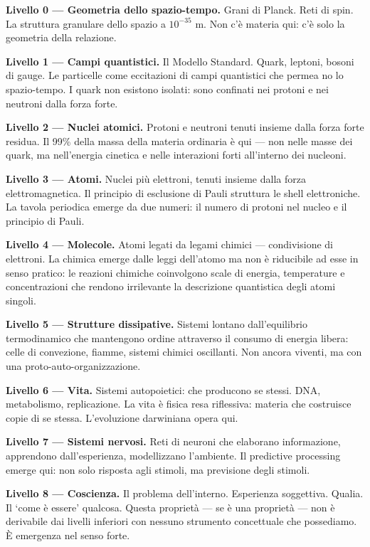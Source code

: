 \documentclass[12pt,a4paper,openany]{book}
\begin{document}
\textbf{Livello 0 — Geometria dello spazio-tempo.} Grani di Planck. Reti di spin. La struttura granulare dello spazio a $10^{-35}$ m. Non c'è materia qui: c'è solo la geometria della relazione.

\textbf{Livello 1 — Campi quantistici.} Il Modello Standard. Quark, leptoni, bosoni di gauge. Le particelle come eccitazioni di campi quantistici che permea no lo spazio-tempo. I quark non esistono isolati: sono confinati nei protoni e nei neutroni dalla forza forte.

\textbf{Livello 2 — Nuclei atomici.} Protoni e neutroni tenuti insieme dalla forza forte residua. Il 99\% della massa della materia ordinaria è qui — non nelle masse dei quark, ma nell'energia cinetica e nelle interazioni forti all'interno dei nucleoni.

\textbf{Livello 3 — Atomi.} Nuclei più elettroni, tenuti insieme dalla forza elettromagnetica. Il principio di esclusione di Pauli struttura le shell elettroniche. La tavola periodica emerge da due numeri: il numero di protoni nel nucleo e il principio di Pauli.

\textbf{Livello 4 — Molecole.} Atomi legati da legami chimici — condivisione di elettroni. La chimica emerge dalle leggi dell'atomo ma non è riducibile ad esse in senso pratico: le reazioni chimiche coinvolgono scale di energia, temperature e concentrazioni che rendono irrilevante la descrizione quantistica degli atomi singoli.

\textbf{Livello 5 — Strutture dissipative.} Sistemi lontano dall'equilibrio termodinamico che mantengono ordine attraverso il consumo di energia libera: celle di convezione, fiamme, sistemi chimici oscillanti. Non ancora viventi, ma con una proto-auto-organizzazione.

\textbf{Livello 6 — Vita.} Sistemi autopoietici: che producono se stessi. DNA, metabolismo, replicazione. La vita è fisica resa riflessiva: materia che costruisce copie di se stessa. L'evoluzione darwiniana opera qui.

\textbf{Livello 7 — Sistemi nervosi.} Reti di neuroni che elaborano informazione, apprendono dall'esperienza, modellizzano l'ambiente. Il predictive processing emerge qui: non solo risposta agli stimoli, ma previsione degli stimoli.

\textbf{Livello 8 — Coscienza.} Il problema dell'interno. Esperienza soggettiva. Qualia. Il `come è essere' qualcosa. Questa proprietà — se è una proprietà — non è derivabile dai livelli inferiori con nessuno strumento concettuale che possediamo. È emergenza nel senso forte.
\end{document}
